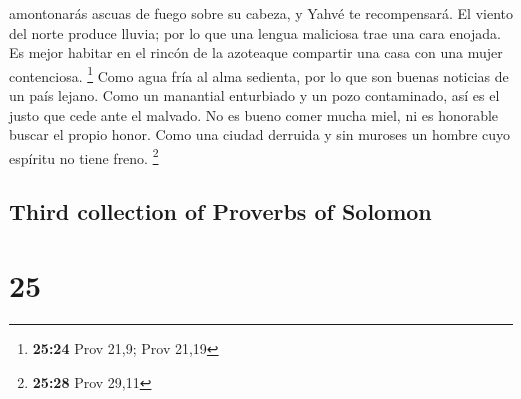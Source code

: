 \begin{paracol}{2}
amontonarás ascuas de fuego sobre su cabeza, y Yahvé te recompensará.
 El viento del norte produce lluvia; por lo que una
lengua maliciosa trae una cara enojada.  Es mejor habitar
en el rincón de la azoteaque compartir una casa con una mujer
contenciosa. \footnote{\textbf{25:24} Prov 21,9; Prov 21,19}
 Como agua fría al alma sedienta, por lo que son buenas
noticias de un país lejano.  Como un manantial enturbiado
y un pozo contaminado, así es el justo que cede ante el malvado.
 No es bueno comer mucha miel, ni es honorable buscar el
propio honor.  Como una ciudad derruida y sin muroses un
hombre cuyo espíritu no tiene freno. \footnote{\textbf{25:28} Prov 29,11}

\switchcolumn
\begin{otherlanguage}{english}

\hypertarget{third-collection-of-proverbs-of-solomon}{%
\subsection{Third collection of Proverbs of
Solomon}\label{third-collection-of-proverbs-of-solomon}}

\hypertarget{section-49}{%
\section{25}\label{section-49}}


\end{otherlanguage}
\end{paracol}
